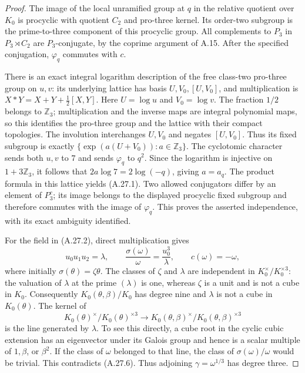 \begin{proof}
The image of the local unramified group at $q$ in the
relative quotient over $K_0$ is procyclic with quotient
$C_2$ and pro-three kernel. Its order-two subgroup is
the prime-to-three component of this procyclic group.
All complements to $P_3$ in $P_3\rtimes C_2$ are
$P_3$-conjugate, by the coprime argument of A.15.
After the specified conjugation, $\varphi_q$ commutes
with $c$.

There is an exact integral logarithm description
of the free class-two pro-three group on $u,v$:
its underlying lattice has basis $U,V_0,[U,V_0]$,
and multiplication is
$X*Y=X+Y+\frac12[X,Y]$. Here
$U=\log u$ and $V_0=\log v$. The fraction $1/2$
belongs to $\mathbb Z_3$; multiplication and the
inverse maps are integral polynomial maps, so this
identifies the pro-three group and the lattice with
their compact topologies. The involution interchanges
$U,V_0$ and negates $[U,V_0]$. Thus its fixed
subgroup is exactly
$\{\exp(a(U+V_0)):a\in\mathbb Z_3\}$.
The cyclotomic character sends both $u,v$ to $7$
and sends $\varphi_q$ to $q^2$. Since the logarithm
is injective on $1+3\mathbb Z_3$, it follows that
$2a\log7=2\log(-q)$, giving $a=a_q$.
The product formula in this lattice yields
(A.27.1). Two allowed conjugators differ by an
element of $P_3^c$; its image belongs to the displayed
procyclic fixed subgroup and therefore commutes with
the image of $\varphi_q$. This proves the asserted
independence, with its exact ambiguity identified.

For the field in (A.27.2), direct multiplication gives
\[
 u_0u_1u_2=\lambda,
 \qquad
 \frac{\sigma(\omega)}{\omega}=
       \frac{u_0^3}{\lambda},
 \qquad c(\omega)=-\omega,
 \tag{A.27.6}
\]
where initially $\sigma(\theta)=\zeta\theta$.
The classes of $\zeta$ and $\lambda$ are independent
in $K_0^\times/K_0^{\times3}$: the valuation of
$\lambda$ at the prime $(\lambda)$ is one, whereas
$\zeta$ is a unit and is not a cube in $K_0$.
Consequently $K_0(\theta,\beta)/K_0$ has degree nine
and $\lambda$ is not a cube in $K_0(\theta)$.
The kernel of
\[
 K_0(\theta)^\times/K_0(\theta)^{\times3}
       \longrightarrow
 K_0(\theta,\beta)^\times/
                       K_0(\theta,\beta)^{\times3}
\]
is the line generated by $\lambda$. To see this
directly, a cube root in the cyclic cubic extension
has an eigenvector under its Galois group and hence
is a scalar multiple of $1,\beta$, or $\beta^2$.
If the class of $\omega$ belonged to that line,
the class of $\sigma(\omega)/\omega$ would be
trivial. This contradicts (A.27.6). Thus adjoining
$\gamma=\omega^{1/3}$ has degree three.


\end{proof}
